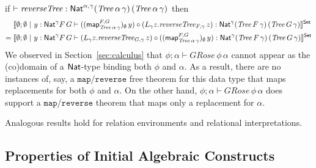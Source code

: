 \documentclass[runningheads]{llncs}
\newcommand{\map}{\mathsf{map}}
\begin{document}
if $\vdash \mathit{reverseTree} : \mathsf{Nat}^{\alpha, \gamma} (\mathit{Tree}
\,\alpha \, \gamma) \, (\mathit{Tree} \, \alpha \, \gamma)$ then
\begin{align*}
  &\setsem{\emptyset; \emptyset~|~y : \Nat^\gamma F \, G 
  \vdash  ((\map_{\mathit{Tree}\,\alpha \, \gamma}^{F,
      G})_\emptyset\, y) \circ (L_{{\gamma}} z. \mathit{reverseTree}_{F,
      \gamma}\, z) : \Nat^{{\gamma}} 
    (\mathit{Tree} \, F \, \gamma) \, (\mathit{Tree} \, G \,
    \gamma) }\\ =\; &\setsem{\emptyset; \emptyset~|~y :
    \Nat^\gamma F \, G \vdash (L_{\gamma}
    z. \mathit{reverseTree}_{G, \gamma}\,z) \circ
    ((\map_{\mathit{Tree} \, \alpha\, \gamma}^{{F},
      {G}})_\emptyset\, y) : \Nat^{\gamma} (\mathit{Tree} \,
    F \, \gamma) \, (\mathit{Tree} \, G\, \gamma)}
\end{align*}
\noindent
We observed in Section~\ref{sec:calculus} that $ \phi; \alpha \vdash
\mathit{GRose}\,\phi\,\alpha$ cannot appear as the (co)domain of a
$\mathsf{Nat}$-type binding both $\phi$ and $\alpha$. As a result, there are
no instances of, say, a $\mathtt{map}$/$\mathtt{reverse}$ free theorem
for this data type that maps replacements for both $\phi$ and
$\alpha$. On the other hand, $\phi; \alpha \vdash
\mathit{GRose}\,\phi\,\alpha$ does support a
$\mathtt{map}$/$\mathtt{reverse}$ theorem that maps only a replacement
for $\alpha$.

Analogous results hold for relation environments and relational
interpretations.

\subsection{Properties of Initial Algebraic Constructs}\label{sec:iaps}
\end{document}
